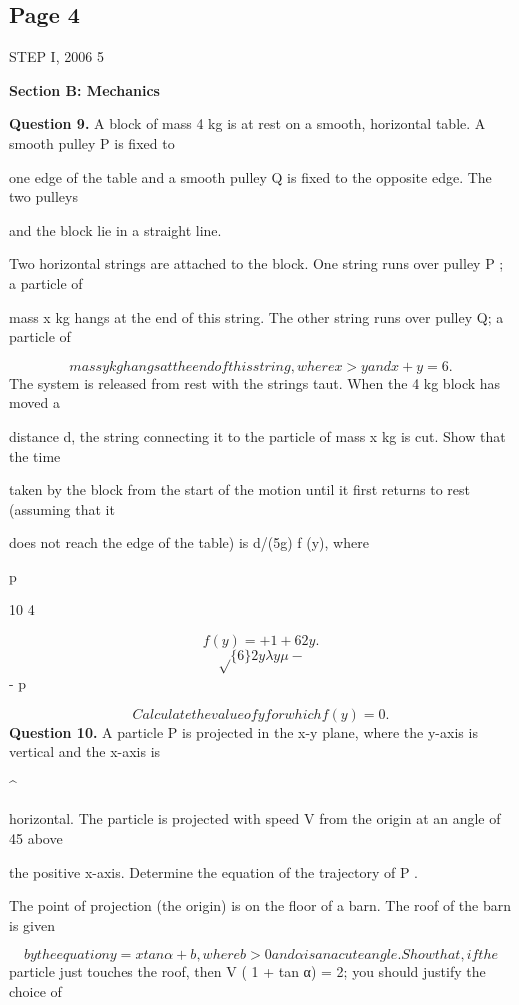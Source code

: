 \documentclass[12pt]{article}
\begin{document}
\subsection*{Page 4}
\begin{flushleft}
STEP I, 2006 5\par
\bigskip\textbf{Section B: Mechanics}\par
\bigskip\textbf{Question 9.} A block of mass 4 kg is at rest on a smooth, horizontal table. A smooth pulley P is fixed to\par
one edge of the table and a smooth pulley Q is fixed to the opposite edge. The two pulleys\par
and the block lie in a straight line.\par
Two horizontal strings are attached to the block. One string runs over pulley P ; a particle of\par
mass x kg hangs at the end of this string. The other string runs over pulley Q; a particle of\par
\[mass y kg hangs at the end of this string, where x > y and x + y = 6 .\]
The system is released from rest with the strings taut. When the 4 kg block has moved a\par
distance d, the string connecting it to the particle of mass x kg is cut. Show that the time\par
taken by the block from the start of the motion until it first returns to rest (assuming that it\par
does not reach the edge of the table) is d/(5g) f (y), where\par
p\par
10 4\par
\[f (y) = + 1 + 6 2y.\]
\[\sqrt\{6\} 2y \lambda y \mu -\]
- p\par
\[Calculate the value of y for which f (y) = 0.\]
\bigskip\textbf{Question 10.} A particle P is projected in the x-y plane, where the y-axis is vertical and the x-axis is\par
\textasciicircum{}\circ\par
horizontal. The particle is projected with speed V from the origin at an angle of 45 above\par
the positive x-axis. Determine the equation of the trajectory of P .\par
The point of projection (the origin) is on the floor of a barn. The roof of the barn is given\par
\[by the equation y = x tan α + b , where b > 0 and α is an acute angle. Show that, if the\]
particle just touches the roof, then V ( 1 + tan α) = 2\sqrtbg; you should justify the choice of\par

\end{flushleft}
\end{document}
